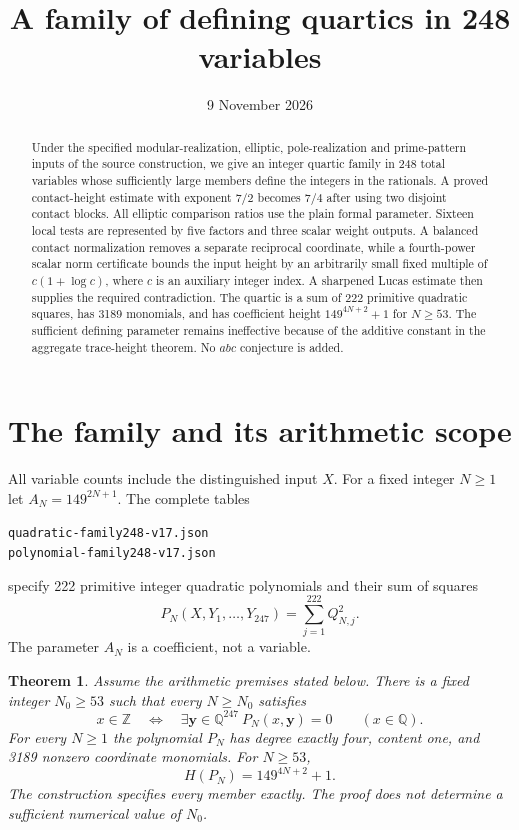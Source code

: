 \documentclass[11pt,a4paper]{article}
\title{A family of defining quartics in 248 variables}
\author{}\date{9 November 2026}
\newtheorem{theorem}{Theorem}[section]\newtheorem{lemma}[theorem]{Lemma}
\newcommand{\Q}{\mathbb Q}\newcommand{\Z}{\mathbb Z}\newcommand{\HH}{\mathcal H}
\begin{document}
\maketitle
\begin{abstract}
Under the specified modular-realization, elliptic, pole-realization and
prime-pattern inputs of the source construction, we give an integer
quartic family in 248 total variables whose sufficiently large members
define the integers in the rationals. A proved contact-height estimate
with exponent $7/2$ becomes $7/4$ after using two disjoint contact blocks.
All elliptic comparison ratios use the plain formal parameter. Sixteen
local tests are represented by five factors and three scalar weight
outputs. A balanced contact normalization removes a separate reciprocal
coordinate, while a fourth-power scalar norm certificate bounds the
input height by an arbitrarily small fixed multiple of $c(1+\log c)$,
where $c$ is an auxiliary integer index. A sharpened Lucas estimate
then supplies the required contradiction.
The quartic is a sum of 222 primitive quadratic squares, has 3189
monomials, and has coefficient height $149^{4N+2}+1$ for $N\ge53$.
The sufficient defining parameter remains ineffective because of the
additive constant in the aggregate trace-height theorem. No $abc$
conjecture is added.
\end{abstract}

\section{The family and its arithmetic scope}
All variable counts include the distinguished input $X$. For a fixed
integer $N\ge1$ let $A_N=149^{2N+1}$. The complete tables
\begin{center}\small
\nolinkurl{quadratic-family248-v17.json}\\
\nolinkurl{polynomial-family248-v17.json}
\end{center}
specify 222 primitive integer
quadratic polynomials and their sum of squares
\[
 P_N(X,Y_1,\ldots,Y_{247})=\sum_{j=1}^{222}Q_{N,j}^2.
\]
The parameter $A_N$ is a coefficient, not a variable.

\begin{theorem}\label{thm:main}
Assume the arithmetic premises stated below. There is a fixed integer
$N_0\ge53$ such that every $N\ge N_0$ satisfies
\[
 x\in\Z\quad\Longleftrightarrow\quad
 \exists\mathbf y\in\Q^{247}\ P_N(x,\mathbf y)=0
 \qquad(x\in\Q).
\]
For every $N\ge1$ the polynomial $P_N$ has degree exactly four,
content one, and 3189 nonzero coordinate monomials. For $N\ge53$,
\[
                       H(P_N)=149^{4N+2}+1.
\]
The construction specifies every member exactly. The proof does not
determine a sufficient numerical value of $N_0$.
\end{theorem}
\end{document}

